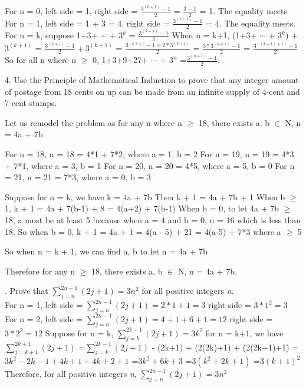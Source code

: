 \documentclass{article}
\begin{document}
\begin{large}
For n = 0, left side = 1, right side = $\frac{3^(0+1)-1}{2}$ = $\frac{3-1}{2}$ = 1. The equality meets
For n = 1, left side = 1 + 3 = 4, right side = $\frac{3^(1+1)-1}{2}$ = 4. The equality meets.
For n = k, suppose 1+3+ $\cdots$ + $3^k$ = $\frac{3^(k+1)-1}{2}$
When n = k+1, (1+3+ $\cdots$ + $3^k$) + $3^(k+1)$ = $\frac{3^(k+1)-1}{2} + 3^(k+1)$
            = $\frac{3^(k+1)-1+2*3^(k+1)}{2}$
            = $\frac{3*3^(k+1)-1}{2}$
            = $\frac{3^((k+1)+1)-1}{2}$
So for all n where n $\ge$ 0, 1+3+9+27+ $\cdots$ + $3^n$ =$\frac{3^(n+1)-1}{2}.$

4. Use the Principle of Mathematical Induction to prove that any integer amount of postage from 18 cents on up can be made from an infinite supply of 4-cent and 7-cent stamps.

Let us remodel the problem as for any n where n $\ge$ 18, there exists a, b $\in$ N, n = 4a + 7b

For n = 18, n = 18 = 4*1 + 7*2, where a = 1, b = 2
For n = 19, n = 19 = 4*3 + 7*1, where a = 3, b = 1
For n = 20, n = 20 = 4*5, where a = 5, b = 0
For n = 21, n = 21 = 7*3, where a = 0, b = 3

Suppose for n = k, we have k = 4a + 7b
Then k + 1 = 4a + 7b + 1
When b $\ge$ 1, k + 1 = 4a + 7(b-1) + 8 = 4(a+2) + 7(b-1)
When b = 0, to let 4a + 7b $\ge$ 18, a must be at least 5 because when a = 4 and b = 0, n = 16 which is less than 18.
So when b = 0, k + 1 = 4a + 1 = 4(a - 5) + 21 = 4(a-5) + 7*3 where a $\ge$ 5

So when n = k + 1, we can find a, b to let n = 4a + 7b

Therefore for any n $\ge$ 18, there exists a, b $\in$ N, n = 4a + 7b.

. Prove that $\sum\limits_{j=n}^{2n-1}(2j+1)=3n^{2}$ for all positive integers \emph{n}.\\

For n = 1, left side = $\sum\limits_{j=n}^{2n-1}(2j+1) = 2 * 1 + 1 = 3$
           right side = $3*1^2 = 3$
For n = 2, left side = $\sum\limits_{j=n}^{2n-1}(2j+1) = 4 + 1 + 6 + 1 = 12$
           right side = $3*2^2 = 12$
Suppose for n = k, $\sum\limits_{j=k}^{2k-1}(2j+1)=3k^{2}$
for n = k+1, we have $\sum\limits_{j=k+1}^{2k+1}(2j+1)$
                    =$\sum\limits_{j=k}^{2k-1}(2j+1)$ - (2k+1) + (2(2k)+1) + (2(2k+1)+1)
                    =$3k^2 - 2k - 1 + 4k + 1 + 4k + 2 + 1$
                    =$3k^2 + 6k + 3$
                    =$3(k^2 + 2k + 1)$
                    =$3(k+1)^2$
Therefore, for all positive integers \emph{n}, $\sum\limits_{j=n}^{2n-1}(2j+1)=3n^{2}$


\end{large}
\end{document}
